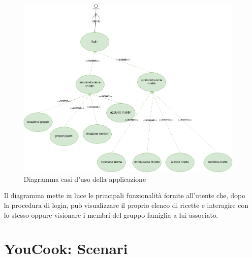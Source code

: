 \begin{figure}[H]
    \centering
 \includegraphics[scale=0.5]{resources/diagramma_casi_uso.drawio.png}
   \caption{Diagramma casi d'uso della applicazione}
\end{figure}
Il diagramma mette in luce le principali funzionalità fornite all'utente che, dopo la procedura di login, può visualizzare il proprio elenco di ricette e interagire con lo stesso  oppure visionare i membri del gruppo famiglia a lui associato.\section{YouCook: Scenari}

